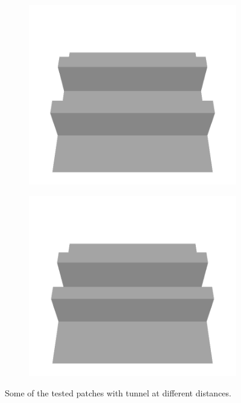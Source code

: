 \documentclass[../document.tex]{subfiles}
\begin{document}
\begin{figure} [htbp]
\begin{subfigure}[b]{0.24\textwidth}
    \includegraphics[width=\linewidth]{../img/5/custom_patches/tunnel/all/20-3d.png}
    \end{subfigure}
    \begin{subfigure}[b]{0.24\textwidth}
    \includegraphics[width=\linewidth]{../img/5/custom_patches/tunnel/all/23-3d.png}
    \end{subfigure}
    \caption{Some of the tested patches with tunnel at different distances.}
    \end{figure}
\end{document}
